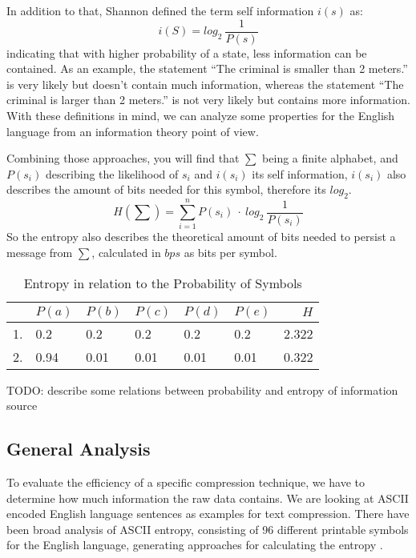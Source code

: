 \par{
In addition to that, Shannon defined the term self information $i(s)$ as:
\[
i(S) = log_{2} \: \frac{1}{P(s)}
\]
indicating that with higher probability of a state, less information can be contained. As an example, the statement \enquote{The criminal is smaller than 2 meters.} is very likely but doesn't contain much information, whereas the statement \enquote{The criminal is larger than 2 meters.} is not very likely but contains more information. With these definitions in mind, we can analyze some properties for the English language from an information theory point of view.
}

\par{
Combining those approaches, you will find that $\sum$ being a finite alphabet, and $P(s_i)$ describing the likelihood of $s_i$ and $i(s_i)$ its self information, $i(s_i)$ also describes the amount of bits needed for this symbol, therefore its $log_2$.
\[
	H(\sum) = \sum_{i = 1}^{n} P(s_i) \: \cdot \: log_{2} \: \frac{1}{P(s_i) }
\]
So the entropy 	also describes the theoretical amount of bits needed to persist a message from $\sum$, calculated in $bps$ as bits per symbol.

\begin{table}
	\centering
\begin{tabular}[p]{l|l|l|l|l|l|r}
	& $P(a)$ & $P(b)$ & $P(c)$ & $P(d)$ & $P(e)$ & $H$ \\
	\hline
	1. & 0.2 & 0.2 & 0.2 & 0.2 & 0.2 & 2.322 \\
	2. & 0.94 & 0.01 & 0.01 & 0.01 & 0.01 & 0.322
	\label{tab:heisetabelle}
\end{tabular}
	\caption{Entropy in relation to the Probability of Symbols}
\end{table}


TODO: describe some relations between probability and entropy of information source
}
\subsection{General Analysis}
\par{
To evaluate the efficiency of a specific compression technique, we have to determine how much information the raw data contains. We are looking at ASCII encoded English language sentences as examples for text compression. There have been broad analysis of ASCII entropy, consisting of 96 different printable symbols for the English language, generating approaches for calculating the entropy \cite{entropy-fernau}.
}

